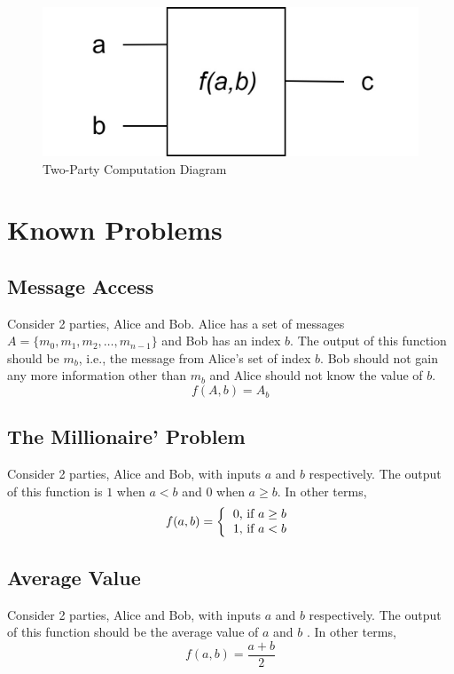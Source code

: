 \renewcommand{\figurename}{Figure}
\begin{figure}[H]
\centering
\includegraphics[width=.4\linewidth]{./figures/mpc/two_party_computation_scheme}
\caption{Two-Party Computation Diagram}
\label{fig:tpcscheme}
\end{figure}

\section{Known Problems}
\subsection{Message Access}
Consider 2 parties, Alice and Bob. Alice has a set of messages $A=\{m_0,m_1,m_2,\ldots,m_{n-1}\}$
and Bob has an index $b$. The output of this function should be $m_b$, i.e., the message from Alice's set of index $b$. Bob should not gain
any more information other than $m_b$ and Alice should not know the value of $b$.
\begin{equation}\label{eq:messageaccess}
f(A,b) = A_b
\end{equation}

\subsection{The Millionaire' Problem}
Consider 2 parties, Alice and Bob, with inputs $a$ and $b$ respectively. The output of this function is $1$ when $a < b$
and $0$ when $a \geq b$. In other terms,
\[
f(a,b) = \left \{
          \begin{tabular}{ccc}
          0, if $a \geq b$ \\
          1, if $a < b$
          \end{tabular}
        \right.
\]

\subsection{Average Value}
Consider 2 parties, Alice and Bob, with inputs $a$ and $b$ respectively. The output of this function should be the average value of $a$ and $b$
. In other terms,
\begin{equation}\label{eq:tpc}
f(a,b) = \frac{a+b}{2}
\end{equation}

